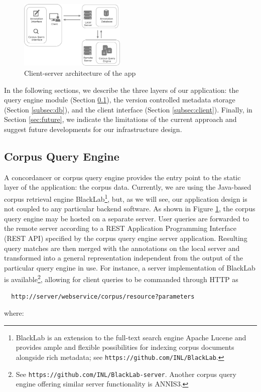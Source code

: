 \documentclass{sig-alternate}
\begin{document}
\begin{figure}
  \centering
  \includegraphics[width=0.45\textwidth]{./img/app-remote.pdf}
  \caption{\label{fig:app}Client-server architecture of the app}
\end{figure}

In the following sections, we describe the three layers of our application: the query engine module
(Section \ref{subsec:conc}), the version controlled metadata storage (Section \ref{subsec:db}),
and the client interface (Section \ref{subsec:client}). Finally, in Section \ref{sec:future},
we indicate the limitations of the current approach and suggest future developments for our
infrastructure design.

\subsection{Corpus Query Engine}\label{subsec:conc}
A concordancer or corpus query engine provides the entry point to the static layer of the
application: the corpus data. Currently, we are using the Java-based corpus retrieval engine
BlackLab\footnote{
  BlackLab is an extension to the full-text search engine Apache Lucene and provides ample and
  flexible possibilities for indexing corpus documents alongside rich metadata; see
  \texttt{https://github.com/INL/BlackLab}.
}, but, as we will see, our application design is not coupled to any particular backend software.
As shown in Figure \ref{fig:app}, the corpus query engine may be hosted on a separate server.
User queries are forwarded to the remote server according to a REST Application Programming
Interface (REST API) specified by the corpus query engine server application. Resulting query
matches are then merged with the annotations on the local server and transformed into a general
representation independent from the output of the particular query engine in use.
For instance, a server implementation of BlackLab is available\footnote{
  See \texttt{https://github.com/INL/BlackLab-server}. Another corpus query engine offering similar
  server functionality is ANNIS3.
}, allowing for client queries to be commanded through HTTP as
\begin{verbatim}
  http://server/webservice/corpus/resource?parameters
\end{verbatim}
where:
\end{document}
